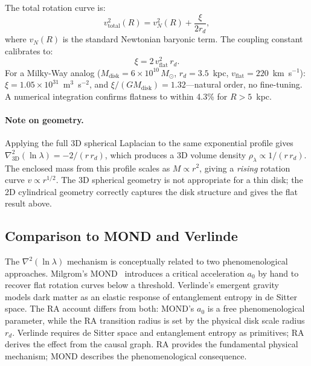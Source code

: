 \documentclass[11pt,a4paper]{article}
\theoremstyle{plain}
\theoremstyle{definition}
\theoremstyle{remark}
\begin{document}
The total rotation curve is:
\begin{equation}
  v_{\mathrm{total}}^2(R) = v_N^2(R) + \frac{\xi}{2r_d},
  \label{eq:v_total}
\end{equation}
where $v_N(R)$ is the standard Newtonian baryonic term.
The coupling constant calibrates to:
\begin{equation}
  \xi = 2\,v_{\mathrm{flat}}^2\,r_d.
  \label{eq:xi_calibration}
\end{equation}
For a Milky-Way analog ($M_{\mathrm{disk}} = 6\times10^{10}\,M_\odot$,
$r_d = 3.5$~kpc, $v_{\mathrm{flat}} = 220$~km~s$^{-1}$):
$\xi = 1.05\times10^{31}$~m$^3$~s$^{-2}$, and
$\xi/(GM_{\mathrm{disk}}) = 1.32$---natural order, no fine-tuning.
A numerical integration confirms flatness to within 4.3\% for $R > 5$~kpc.

\paragraph{Note on geometry.}
Applying the full 3D spherical Laplacian to the same exponential profile gives
$\nabla^2_\text{3D}(\ln\lambda) = -2/(r\,r_d)$, which produces a 3D volume
density $\rho_\lambda \propto 1/(r\,r_d)$. The enclosed mass from this profile
scales as $M \propto r^2$, giving a \emph{rising} rotation curve $v \propto r^{1/2}$.
The 3D spherical geometry is not appropriate for a thin disk; the 2D cylindrical
geometry correctly captures the disk structure and gives the flat result above.

\subsection{Comparison to MOND and Verlinde}

The $\nabla^2(\ln\lambda)$ mechanism is conceptually related to two
phenomenological approaches. Milgrom's MOND~\citep{Milgrom1983} introduces a
critical acceleration $a_0$ by hand to recover flat rotation curves below a
threshold. Verlinde's emergent gravity~\citep{Verlinde2011} models dark matter as
an elastic response of entanglement entropy in de Sitter space. The RA account
differs from both: MOND's $a_0$ is a free phenomenological parameter, while
the RA transition radius is set by the physical disk scale radius $r_d$. Verlinde
requires de Sitter space and entanglement entropy as primitives; RA derives the
effect from the causal graph. RA provides the fundamental physical mechanism; MOND
describes the phenomenological consequence.


\end{document}

